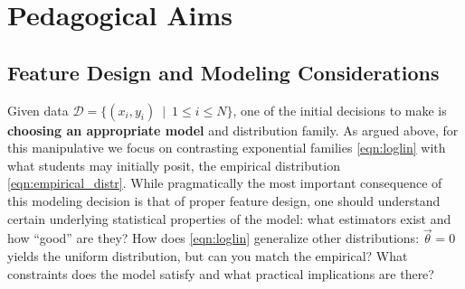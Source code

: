 \documentclass[11pt,letterpaper]{article}
\newcommand{\Note}[1]{}
\renewcommand{\Note}[1]{\hl{[#1]}}
\newcommand{\NoteSigned}[3]{{\sethlcolor{#2}\Note{#1: #3}}}
\newcommand{\NoteJE}[1]{\NoteSigned{JE}{LightGreen}{#1}}
\newcommand{\Commented}[1]{}
\newcommand{\Data}[0]{\ensuremath{\mathcal{D}}}
\begin{document}
%
%
%


\section{Pedagogical Aims}\label{sec:aims}

\Commented{
\NoteJE{This key section is a bit hard to read and especially to skim.
  It has too much repetitive padding about our desires, and what the
  students must do, and how ``important'' it is.  Instead, could we
  just list the facts about log-linear models that we want students to
  appreciate?  (You should be able to harvest these by going through
  the lessons.)  That is, it would be crisper to stay focused on the
  properties of the model rather than referring repeatedly to the
  people.  See for example the bullet points in section 3 of
  eisner-2002-tnlp, although you don't necessarily need to follow that
  format.}}


\subsection{Feature Design and Modeling Considerations}

Given data $\Data{} = \{( x_i, y_i)\ \mid\ 1 \le i \le N\}$, one of the initial decisions 
to make is \textbf{choosing an appropriate model} and distribution family. 
As argued above, for this manipulative we focus on contrasting exponential families 
\eqref{eqn:loglin} with what students may initially posit, the empirical 
distribution \eqref{eqn:empirical_distr}. While pragmatically the most important 
consequence of this modeling decision is that of proper feature design, one should 
understand certain underlying statistical properties of the model: what estimators 
exist and how ``good'' are they? How does \eqref{eqn:loglin} generalize other 
distributions: $\vec{\theta} = 0$ yields the uniform distribution, but can you match 
the empirical? What constraints does the model satisfy and what practical implications
are there?
 
\end{document}
